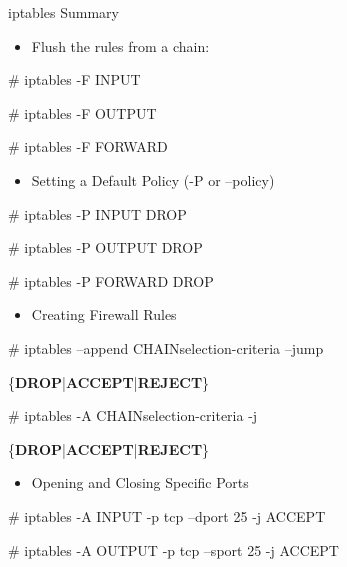 \begin{frame}[t,allowframebreaks]{iptables Summary}
  \fontsize{15}{18}\selectfont
  \begin{itemize}
    \item Flush the rules from a chain:
  \end{itemize}
  \vspace{0.08cm}
  {\color{CommandGreen}\ttfamily\fontsize{13.5}{16.5}\selectfont \# iptables -F INPUT\par}
  \vspace{0.08cm}
  {\color{CommandGreen}\ttfamily\fontsize{13.5}{16.5}\selectfont \# iptables -F OUTPUT\par}
  \vspace{0.08cm}
  {\color{CommandGreen}\ttfamily\fontsize{13.5}{16.5}\selectfont \# iptables -F FORWARD\par}
  \begin{itemize}
    \item Setting a Default Policy (-P or --policy)
  \end{itemize}
  \vspace{0.08cm}
  {\color{CommandGreen}\ttfamily\fontsize{13.5}{16.5}\selectfont \# iptables -P INPUT DROP\par}
  \vspace{0.08cm}
  {\color{CommandGreen}\ttfamily\fontsize{13.5}{16.5}\selectfont \# iptables -P OUTPUT DROP\par}
  \vspace{0.08cm}
  {\color{CommandGreen}\ttfamily\fontsize{13.5}{16.5}\selectfont \# iptables -P FORWARD DROP\par}
  \begin{itemize}
    \item Creating Firewall Rules
  \end{itemize}
  \vspace{0.08cm}
  {\color{CommandGreen}\ttfamily\fontsize{13.5}{16.5}\selectfont \# iptables --append CHAINselection-criteria --jump\par}
  \{\textcolor{WarningColor}{\bfseries DROP}|\textcolor{WarningColor}{\bfseries ACCEPT}|\textcolor{WarningColor}{\bfseries REJECT}\}\par
  \vspace{0.08cm}
  {\color{CommandGreen}\ttfamily\fontsize{13.5}{16.5}\selectfont \# iptables -A CHAINselection-criteria -j\par}
  \{\textcolor{WarningColor}{\bfseries DROP}|\textcolor{WarningColor}{\bfseries ACCEPT}|\textcolor{WarningColor}{\bfseries REJECT}\}\par
  \begin{itemize}
    \item Opening and Closing Specific Ports
  \end{itemize}
  \vspace{0.08cm}
  {\color{CommandGreen}\ttfamily\fontsize{13.5}{16.5}\selectfont \# iptables -A INPUT -p tcp --dport 25 -j ACCEPT\par}
  \vspace{0.08cm}
  {\color{CommandGreen}\ttfamily\fontsize{13.5}{16.5}\selectfont \# iptables -A OUTPUT -p tcp --sport 25 -j ACCEPT\par}
\end{frame}

